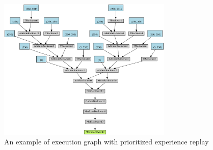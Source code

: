\documentclass[11pt, a4paper, hidelinks]{report}
\begin{document}
\begin{figure}
\centering
\includegraphics[width=0.74\textwidth]{resources/d3qn_per_graph.png}
\caption{An example of execution graph with prioritized experience replay}
\label{fig:d3qn_per_graph}
\end{figure}
\end{document}
